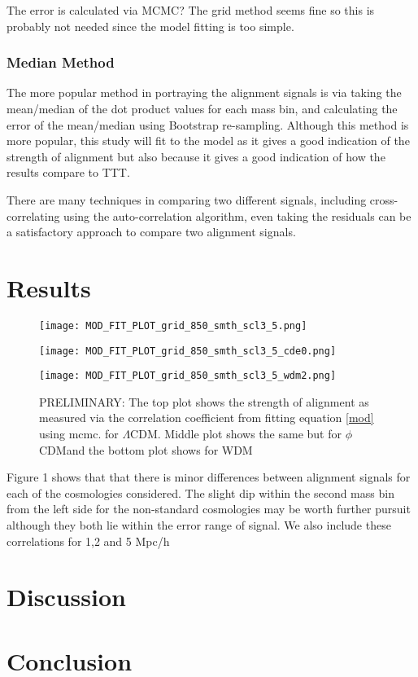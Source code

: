 \documentclass[a4paper,fleqn,usenatbib]{mnras}
\def \qcdm{$\phi$CDM}
\begin{document}
The error is calculated via MCMC? The grid method seems fine so this is probably not needed since the model fitting is too simple.
\subsubsection{Median Method}
The more popular method in portraying the alignment signals is via taking the mean/median of the dot product values for each mass bin, and calculating the error of the mean/median using Bootstrap re-sampling. Although this method is more popular, this study will fit to the model as it gives a good indication of the strength of alignment but also because it gives a good indication of how the results compare to TTT.

There are many techniques in comparing two different signals, including cross-correlating using the auto-correlation algorithm, even taking the residuals can be a satisfactory approach to compare two alignment signals.

\section{Results}\label{results}
 
\begin{figure}
\centering
\texttt{[image: MOD\_FIT\_PLOT\_grid\_850\_smth\_scl3\_5.png]}
\label{cor_fig} 
\end{figure}
\begin{figure}
\centering
\texttt{[image: MOD\_FIT\_PLOT\_grid\_850\_smth\_scl3\_5\_cde0.png]}\label{cor_fig_cde0} 

\end{figure}
\begin{figure}
\centering
\texttt{[image: MOD\_FIT\_PLOT\_grid\_850\_smth\_scl3\_5\_wdm2.png]}\label{cor_fig_wdm2} 
\caption{PRELIMINARY: The top plot shows the strength of alignment as measured via the correlation coefficient from fitting equation \ref{mod} using mcmc. for $\Lambda$CDM. Middle plot shows the same but for \qcdm and the bottom plot shows for WDM}
\end{figure}
Figure 1 shows that that there is minor differences between alignment signals for each of the cosmologies considered. The slight dip within the second mass bin from the left side for the non-standard cosmologies may be worth further pursuit although they both lie within the error range of \citet{Trowland_13} signal. We also include these correlations for 1,2 and 5 Mpc/h

\section{Discussion}\label{discussion}

\section{Conclusion}\label{conclusion}


 

\bsp	%
\label{lastpage}
\end{document}
